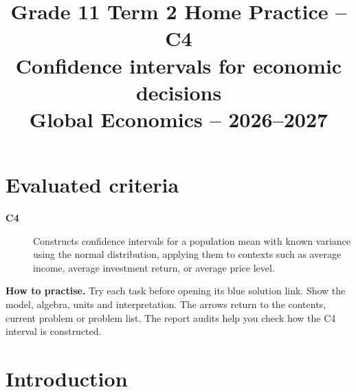 \makeatletter
{}
\makeatother


\GTenHighlightsfalse %

\CoordinatedTermTwoPalette
\usepackage{needspace}
\usepackage{titling}
\setlength{\droptitle}{-2em}
\pretitle{\par\begingroup\centering\LARGE}
\posttitle{\par\endgroup}
\preauthor{}\postauthor{}
\predate{}\postdate{}
\maketitlehookd{\vspace{-1em}}
\linespread{1.12}
\setlength{\parskip}{5pt}
\newcommand{\ExampleOne}{\textbullet\ \hyperref[ex:intro-one]{Example 1}: }
\newcommand{\ExampleTwo}{\textbullet\ \hyperref[ex:intro-two]{Example 2}: }
\title{Grade 11 Term 2 Home Practice -- C4\\\large Confidence intervals for economic decisions\\[0.25em]
\normalsize Global Economics -- 2026--2027}
\author{}
\date{}

\maketitle
\setcounter{tocdepth}{1}
\setcounter{secnumdepth}{2}
\label{toc}
\tableofcontents
\section*{Evaluated criteria}

\begin{description}
\item[\textbf{C4}] Constructs confidence intervals for a population mean with known variance using the normal distribution, applying them to contexts such as average income, average investment return, or average price level.
\end{description}
\textbf{How to practise.} Try each task before opening its blue solution link. Show the model, algebra, units and interpretation. The arrows return to the contents, current problem or problem list. The report audits help you check how the C4 interval is constructed.

\clearpage
\section{Introduction}\label{sec:introduction}
